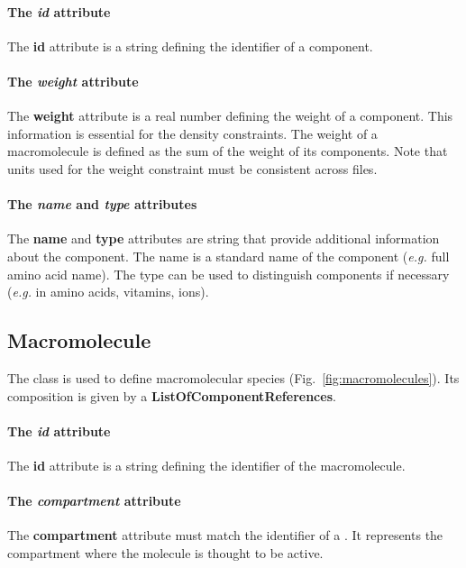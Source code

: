 \paragraph{The \textit{id} attribute}
The \textbf{id} attribute is a string defining the identifier of a component.

\paragraph{The \textit{weight} attribute}
The \textbf{weight} attribute is a real number defining the weight of a
component.
This information is essential for the density constraints.
The weight of a macromolecule is defined as the sum of the weight of its
components.
Note that units used for the weight constraint must be consistent across
files.

\paragraph{The \textit{name} and \textit{type} attributes}
The \textbf{name} and \textbf{type} attributes are string that provide
additional information about the component.
The name is a standard name of the component
(\textit{e.g.} full amino acid name).
The type can be used to distinguish components if necessary
(\textit{e.g.} in amino acids, vitamins, ions).


\subsection{Macromolecule}
\label{sec:macromolecule}

The \macromolecule{} class is used to define macromolecular species
(Fig.~\ref{fig:macromolecules}).
Its composition is given by a \textbf{ListOfComponentReferences}.

\paragraph{The \textit{id} attribute}
The \textbf{id} attribute is a string defining the identifier of
the macromolecule.

\paragraph{The \textit{compartment} attribute}
The \textbf{compartment} attribute must match the identifier of a \compartment.
It represents the compartment where the molecule is thought to be active.


